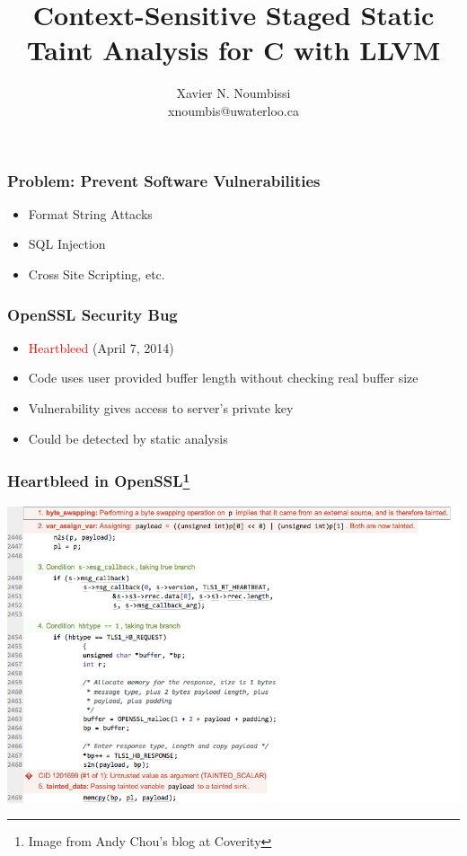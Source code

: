 \documentclass[xcolor=dvipsnames]{beamer}
\title[\waint]
{Context-Sensitive Staged Static Taint Analysis for C with LLVM}
\author[]{Xavier N. Noumbissi\\
\small{xnoumbis@uwaterloo.ca}}
\institute[2014 ECE Graduate Research Seminar]{Department of Electrical and Computer Engineering\\ University of Waterloo}
\date{}
\begin{document}
\begin{frame}
  \titlepage
\end{frame}


\begin{frame}
  \frametitle{Problem: Prevent Software Vulnerabilities} {\Large	
	\begin{itemize}
	 \item Format String Attacks
	 \vspace{0.5cm}
	 \item SQL Injection
	 \vspace{0.5cm}
	 \item Cross Site Scripting, etc.
	\end{itemize}  
	}
\end{frame}


\begin{frame}
  \frametitle{OpenSSL Security Bug} {\large	
	\begin{itemize}
	 \item \textcolor{red}{Heartbleed} (April 7, 2014)
	 \vspace{0.5cm}
	 \item Code uses user provided buffer length without
	       checking real buffer size
	 \vspace{0.5cm}
	 \item Vulnerability gives access to server's private key
	 \vspace{0.5cm}	 
	 	 \item Could be detected by static analysis
	\end{itemize}  
	}
\end{frame}

\begin{frame}
  \frametitle{Heartbleed in OpenSSL\footnote{Image from Andy Chou's blog at Coverity}} {\large	
	\begin{center}
	\includegraphics[scale=0.35]{heartbleed}
	\end{center}   
	}
\end{frame}
\end{document}
